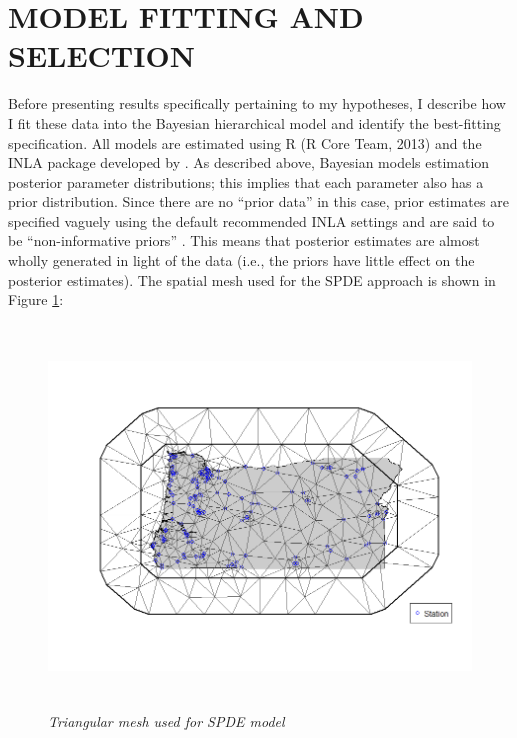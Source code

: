 \documentclass[12pt,a4paper,titlepage]{article}
\begin{document}
\section*{\bf\MakeUppercase{Model Fitting and Selection}}

Before presenting results specifically pertaining to my hypotheses, I describe how I fit these data into the Bayesian hierarchical model and identify the best-fitting specification. All models are estimated using R (R Core Team, 2013) and the INLA package developed by \textcite{rue2009}. As described above, Bayesian models estimation posterior parameter distributions; this implies that each parameter also has a prior distribution. Since there are no “prior data” in this case, prior estimates are specified vaguely using the default recommended INLA settings \parencite{rue2009} and are said to be “non-informative priors” \parencite{gelman2013}. This means that posterior estimates are almost wholly generated in light of the data (i.e., the priors have little effect on the posterior estimates). The spatial mesh used for the SPDE approach is shown in Figure \ref{fig:mesh}:

\begin{figure}[!ht]
\graphicspath{ {`/Users/TScott/Google\space Drive/quinalt/APPAM_2014/'}}
\includegraphics[trim = 30mm 34mm 10mm 30mm, clip, width=6in, height=4in]{oregonmeshplot.png}
\noindent
\caption{\textit{Triangular mesh used for SPDE model}}
\label{fig:mesh}
\end{figure}
\end{document}
